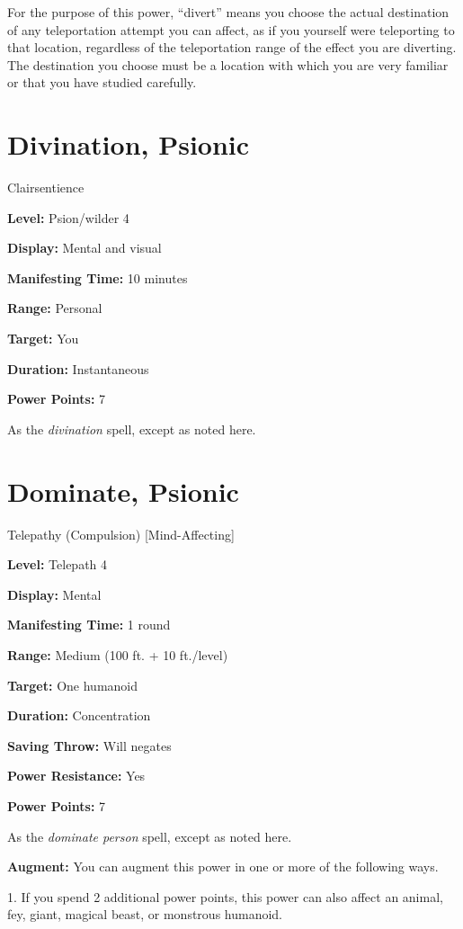 \documentclass{article}
\begin{document}
For the purpose of this power, ``divert'' means you choose the actual destination 
of any teleportation attempt you can affect, as if you yourself were teleporting 
to that location, regardless of the teleportation range of the effect you are diverting. 
The destination you choose must be a location with which you are very familiar 
or that you have studied carefully.

\vspace{12pt}
\section*{Divination, Psionic}

Clairsentience

\textbf{Level:} Psion/wilder 4

\textbf{Display:} Mental and visual

\textbf{Manifesting Time:} 10 minutes

\textbf{Range:} Personal

\textbf{Target:} You

\textbf{Duration:} Instantaneous

\textbf{Power Points:} 7

As the \textit{divination }spell, except as noted here. 

\vspace{12pt}
\section*{Dominate, Psionic}

Telepathy (Compulsion) [Mind-Affecting]

\textbf{Level:} Telepath 4

\textbf{Display:} Mental

\textbf{Manifesting Time:} 1 round

\textbf{Range:} Medium (100 ft. + 10 ft./level)

\textbf{Target:} One humanoid

\textbf{Duration:} Concentration

\textbf{Saving Throw:} Will negates

\textbf{Power Resistance:} Yes

\textbf{Power Points:} 7

As the \textit{dominate person} spell, except as noted here.

\textbf{Augment:} You can augment this power in one or more of the following ways.

1. If you spend 2 additional power points, this power can also affect an animal, 
fey, giant, magical beast, or monstrous humanoid.
\end{document}
